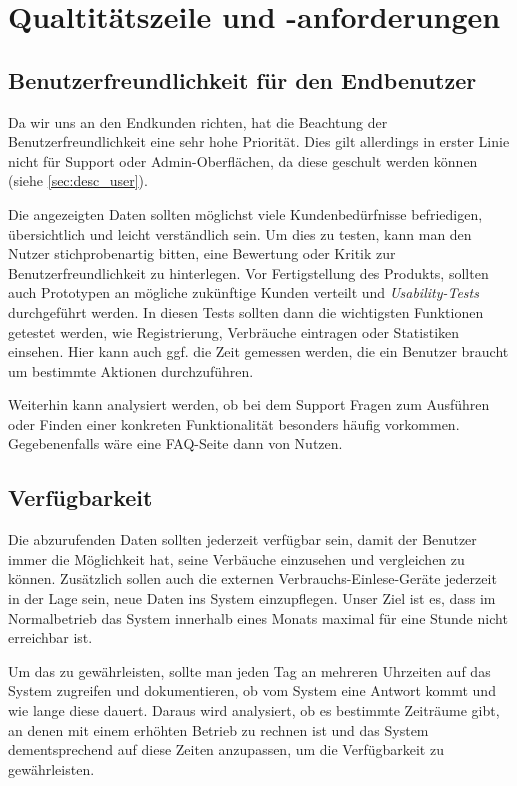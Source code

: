 \section{Qualtitätszeile und -anforderungen}

\subsection{Benutzerfreundlichkeit für den Endbenutzer}
Da wir uns an den Endkunden richten, hat die Beachtung der Benutzerfreundlichkeit eine sehr hohe Priorität. Dies gilt allerdings in erster Linie nicht für Support oder Admin-Oberflächen, da diese geschult werden können (siehe \ref{sec:desc_user}).

Die angezeigten Daten sollten möglichst viele Kundenbedürfnisse
befriedigen, übersichtlich und leicht verständlich sein.
Um dies zu testen, kann man den Nutzer stichprobenartig bitten, eine Bewertung oder Kritik zur Benutzerfreundlichkeit zu hinterlegen.
Vor Fertigstellung des Produkts, sollten auch Prototypen an mögliche zukünftige Kunden verteilt und \textit{Usability-Tests} durchgeführt werden. In diesen Tests sollten dann die wichtigsten Funktionen getestet werden, wie Registrierung, Verbräuche eintragen oder Statistiken einsehen.
Hier kann auch ggf. die Zeit gemessen werden, die ein Benutzer braucht um bestimmte Aktionen durchzuführen.

Weiterhin kann analysiert werden, ob bei dem Support Fragen zum Ausführen oder Finden einer konkreten Funktionalität besonders häufig vorkommen. Gegebenenfalls wäre eine FAQ-Seite dann von Nutzen.

\subsection{Verfügbarkeit}
Die abzurufenden Daten sollten jederzeit verfügbar sein,
damit der Benutzer immer die Möglichkeit hat,
seine Verbäuche einzusehen und vergleichen zu können. Zusätzlich sollen auch die externen Verbrauchs-Einlese-Geräte jederzeit in der Lage sein, neue Daten ins System einzupflegen.
Unser Ziel ist es, dass im Normalbetrieb das System innerhalb eines Monats maximal für eine Stunde nicht erreichbar ist.

Um das zu gewährleisten, sollte man jeden Tag an mehreren Uhrzeiten auf das System zugreifen
und dokumentieren, ob vom System eine Antwort kommt und wie lange diese dauert.
Daraus wird analysiert, ob es bestimmte Zeiträume gibt,
an denen mit einem erhöhten Betrieb zu rechnen ist und das System dementsprechend auf diese Zeiten anzupassen, um die Verfügbarkeit zu gewährleisten.

